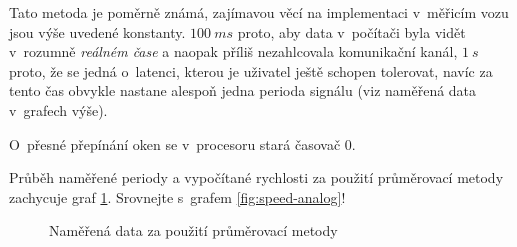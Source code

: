 Tato metoda je poměrně známá, zajímavou věcí na implementaci v~měřicím vozu
jsou výše uvedené konstanty. $100\ ms$ proto, aby data v~počítači byla vidět
v~rozumně \textit{reálném čase} a naopak příliš nezahlcovala komunikační kanál,
$1\ s$ proto, že se jedná o~latenci, kterou je uživatel ještě schopen tolerovat,
navíc za tento čas obvykle nastane alespoň jedna perioda signálu (viz naměřená
data v~grafech výše).

O~přesné přepínání oken se v~procesoru stará časovač 0.

Průběh naměřené periody a vypočítané rychlosti za použití průměrovací metody
zachycuje graf \ref{fig:prumer}. Srovnejte s~grafem \ref{fig:speed-analog}!

\begin{figure}[h]

\caption{Naměřená data za použití průměrovací metody}
\label{fig:prumer}
\end{figure}
